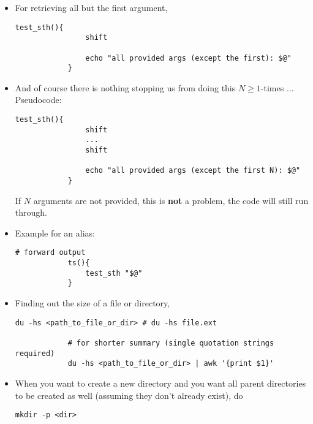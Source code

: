 \documentclass[12pt, a4paper]{article}
\numberwithin{equation}{section}
\theoremstyle{definition}
\theoremstyle{definition}
\begin{document}
\begin{itemize}
		\item For retrieving all but the first argument, 
		
		\begin{lstlisting}[style=mystylebash, label=alg:bash__args_shift, xleftmargin=\parindent]
			test_sth(){
				shift
				
				echo "all provided args (except the first): $@"
			}
		\end{lstlisting}
		
		\item And of course there is nothing stopping us from doing this $N\geq 1$-times $\dots$ Pseudocode: 
		
		\begin{lstlisting}[style=mystylebash, label=alg:bash__args_shift_gen, xleftmargin=\parindent]
			test_sth(){
				shift
				...
				shift
				
				echo "all provided args (except the first N): $@"
			}
		\end{lstlisting}
		
		If $N$ arguments are not provided, this is \textbf{not} a problem, the code will still run through.
		
		\item Example for an alias:
		
		\begin{lstlisting}[style=mystylebash, label=alg:bash_aliases, xleftmargin=\parindent]
			# forward output
			ts(){
				test_sth "$@"
			}
		\end{lstlisting}
	
		\item Finding out the size of a file or directory,
		
		\begin{lstlisting}[style=mystylebash, label=alg:dir_size, xleftmargin=\parindent]
			du -hs <path_to_file_or_dir> # du -hs file.ext
			
			# for shorter summary (single quotation strings required)
			du -hs <path_to_file_or_dir> | awk '{print $1}'
		\end{lstlisting}
	
		\item When you want to create a new directory and you want all parent directories to be created as well (assuming they don't already exist), do
		
		\begin{lstlisting}[style=mystylebash, label=alg:bash__dir_creation, xleftmargin=\parindent]
			mkdir -p <dir>
		\end{lstlisting}
		

\end{itemize}
\end{document}
